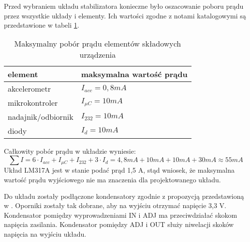 Przed wybraniem układu stabilizatora konieczne było oszacowanie poboru prądu przez wszystkie układy i elementy. Ich wartości zgodne z notami katalogowymi są przedstawione w tabeli \ref{tab_pobor}.
\begin{table}[H]
\centering
\begin{tabular}{l|l} \hline
		\textbf{element} & \textbf{maksymalna wartość prądu} \\ \hline
		akcelerometr &	$I_{acc} = 0,8 mA$ \\
		mikrokontroler & $I_{\mu C} = 10 mA$ \\
		nadajnik/odbiornik & $I_{232} = 10 mA$ \\
		diody & $I_d = 10 mA$ \\
	\end{tabular}
\caption{Maksymalny pobór prądu elementów składowych urządzenia}
\label{tab_pobor}
\end{table}
Całkowity pobór prądu w układzie wyniesie:
\begin{equation*}
	\sum I = 6\cdot I_{acc} + I_{\mu C} + I_{232} + 3\cdot I_d = 4,8mA + 10mA + 10mA + 30mA \approx 55mA
\end{equation*}
Układ LM317A jest w stanie podać prąd 1,5 A, stąd wniosek, że maksymalna wartość prądu wyjściowego nie ma znaczenia dla projektowanego układu.

Do układu zostały podłączone kondensatory zgodnie z propozycją przedstawioną w \cite{lm317}. Oporniki zostały tak dobrane, aby na wyjściu otrzymać napięcie 3,3 V. Kondensator pomiędzy wyprowadzeniami IN i ADJ ma przeciwdziałać skokom napięcia zasilania. Kondensator pomiędzy ADJ i OUT służy niwelacji skoków napięcia na wyjściu układu.

